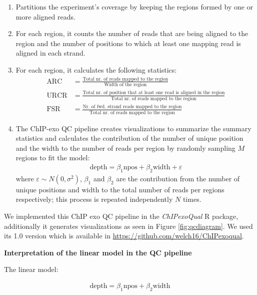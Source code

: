\documentclass{bmcart}\usepackage[]{graphicx}\usepackage[]{color}
\begin{document}
\begin{enumerate}
\item Partitions the experiment's coverage by keeping the regions
  formed by one or more aligned reads.
\item For each region, it counts the number of reads that are being
  aligned to the region and the number of positions to which at least
  one mapping read is aligned in each strand.
\item For each region, it calculates the following statistics:
  \begin{align*}
    \mbox{ARC} &= \frac{\text{Total nr. of reads mapped to the region}}{\text{Width of the region}} \\
    \mbox{URCR} &= \frac{\text{Total nr. of position that at least
        one read is aligned in the region}}{\text{Total nr. of reads mapped 
              to the region}} \\
    \mbox{FSR} &= \frac{\text{Nr. of fwd. strand reads mapped to the region}}                 {\text{Total nr. of reads mapped to the region}} 
  \end{align*}
\item The ChIP-exo QC pipeline creates visualizations to summarize the
  summary statistics and calculates the contribution of the number of
  unique position and the width to the number of reads per region by
  randomly sampling $M$ regions to fit the model:
  \begin{align*}
    \mbox{depth} = \beta_1 \mbox{npos} + \beta_2 \mbox{width} + \varepsilon
  \end{align*}
  where $\varepsilon \sim N(0,\sigma^2)$, $\beta_1$ and $\beta_2$ are
  the contribution from the number of unique positions and width to
  the total number of reads per regions respectively; this process is
  repeated independently $N$ times. 
\end{enumerate}

We implemented this ChIP exo QC pipeline in the \emph{ChIPexoQual} R
package, additionally it generates visualizations as seen in Figure
\ref{fig:qcdiagram}. We used its 1.0 version which is available in
\url{https://github.com/welch16/ChIPexoqual}.

\textbf{Interpretation of the linear model in the QC pipeline}

The linear model:

\begin{align*}
  \mbox{depth} = \beta_1 \mbox{npos} + \beta_2 \mbox{width}
\end{align*}
\end{document}
